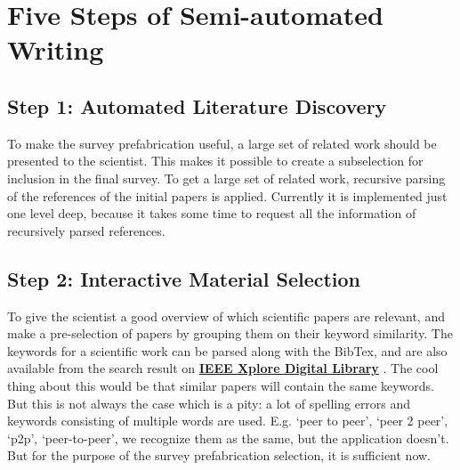 \documentclass[12pt]{article}
\begin{document}
\section{Five Steps of Semi-automated Writing}

\subsection{Step 1: Automated Literature Discovery}
To make the survey prefabrication useful, a large set of related work should be presented to the scientist. This makes it possible to create a subselection for inclusion in the final survey. To get a large set of related work, recursive parsing of the references of the initial papers is applied. Currently it is implemented just one level deep, because it takes some time to request all the information of recursively parsed references.

\subsection{Step 2: Interactive Material Selection}
To give the scientist a good overview of which scientific papers are relevant, and make a pre-selection of papers by grouping them on their keyword similarity. The keywords for a scientific work can be parsed along with the BibTex, and are also available from the search result on \textbf{\href{http://ieeexplore.ieee.org/Xplore/home.jsp}{IEEE Xplore Digital Library}} . The cool thing about this would be that similar papers will contain the same keywords. But this is not always the case which is a pity: a lot of spelling errors and keywords consisting of multiple words are used. E.g. `peer to peer', `peer 2 peer', `p2p', `peer-to-peer', we recognize them as the same, but the application doesn't. But for the purpose of the survey prefabrication selection, it is sufficient now.
\end{document}

